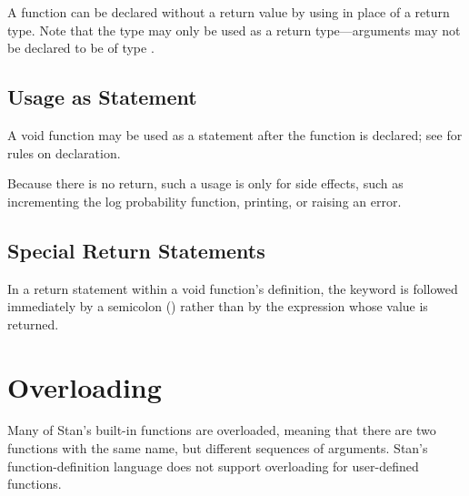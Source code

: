 A function can be declared without a return value by using 
in place of a return type.  Note that the type  may only be
used as a return type---arguments may not be declared to be of type
.

\subsection{Usage as Statement}

A void function may be used as a statement after the function is
declared;  see  for rules on declaration.

Because there is no return, such a usage is only for side effects,
such as incrementing the log probability function, printing, or
raising an error.

\subsection{Special Return Statements}

In a return statement within a void function's definition, the
 keyword is followed immediately by a semicolon
(\code{;}) rather than by the expression whose value is returned.


\section{Overloading}\label{function-overloading.section}


Many of Stan's built-in functions are overloaded, meaning that there
are two functions with the same name, but different sequences of
arguments.  Stan's function-definition language does not
support overloading for user-defined functions.

